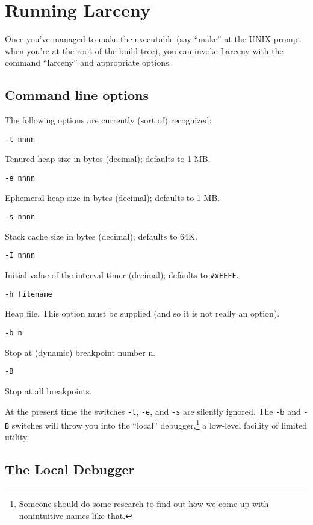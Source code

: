 \section{Running Larceny}

Once you've managed to make the executable (say ``make'' at the UNIX prompt
when you're at the root of the build tree), you can invoke Larceny with
the command ``larceny'' and appropriate options. 

\subsection{Command line options}

The following options are currently (sort of) recognized:

\begin{description}
\item {\tt -t nnnn}

 Tenured heap size in bytes (decimal); defaults to 1 MB.
\item {\tt -e nnnn}

 Ephemeral heap size in bytes (decimal); defaults to 1 MB.
\item {\tt -s nnnn}

 Stack cache size in bytes (decimal); defaults to 64K.
\item {\tt -I nnnn} 

Initial value of the interval timer (decimal); defaults
to \verb+#xFFFF+.

\item {\tt -h filename}

 Heap file. This option must be supplied (and so it
is not really an option).

\item {\tt -b n}

 Stop at (dynamic) breakpoint number n.

\item {\tt -B}

 Stop at all breakpoints.
\end{description}

At the present time the switches {\tt -t}, {\tt -e}, and {\tt -s} are 
silently ignored. The {\tt -b} and {\tt -B} switches will throw you
into the ``local'' debugger,\footnote{Someone should do some research to find
out how we come up with nonintuitive names like that.} a low-level
facility of limited utility.

\subsection{The Local Debugger}


